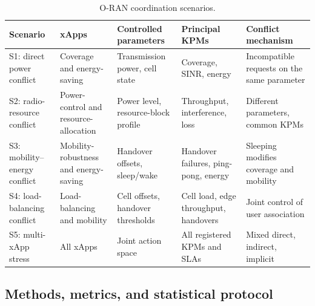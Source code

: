 \documentclass[pdflatex,sn-mathphys-num,iicol,oneside]{sn-jnl}
\begin{document}
\begin{table}[t]
\centering
\caption{O-RAN coordination scenarios.}
\label{tab:scenarios}
\setlength{\tabcolsep}{4pt}\small
\begin{tabular}{p{18mm}p{27mm}p{32mm}p{32mm}p{36mm}}
\toprule
Scenario & xApps & Controlled parameters & Principal KPMs &
Conflict mechanism\\
\midrule
S1: direct power conflict &
Coverage and energy-saving &
Transmission power, cell state &
Coverage, SINR, energy &
Incompatible requests on the same parameter\\
S2: radio-resource conflict &
Power-control and resource-allocation &
Power level, resource-block profile &
Throughput, interference, loss &
Different parameters, common KPMs\\
S3: mobility--energy conflict &
Mobility-robustness and energy-saving &
Handover offsets, sleep/wake &
Handover failures, ping-pong, energy &
Sleeping modifies coverage and mobility\\
S4: load-balancing conflict &
Load-balancing and mobility &
Cell offsets, handover thresholds &
Cell load, edge throughput, handovers &
Joint control of user association\\
S5: multi-xApp stress &
All xApps &
Joint action space &
All registered KPMs and SLAs &
Mixed direct, indirect, implicit\\
\bottomrule
\end{tabular}
\normalsize
\end{table}

\subsection{Methods, metrics, and statistical protocol}
\end{document}
